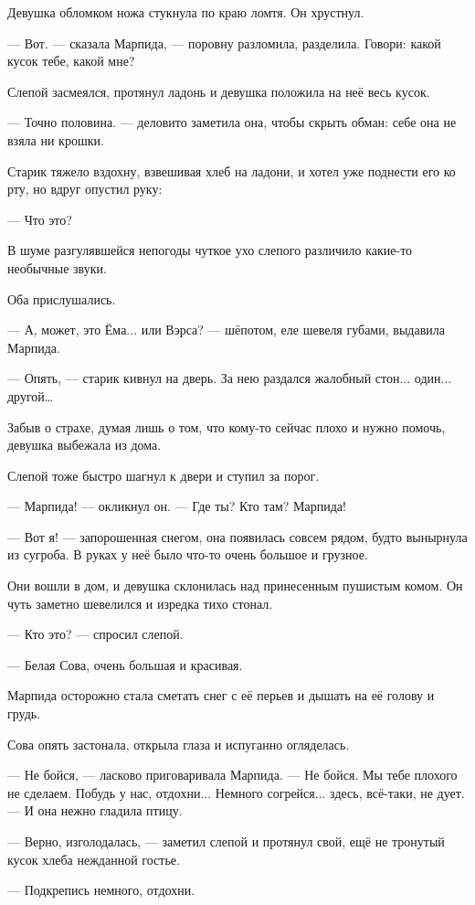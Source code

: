 \documentclass[oneside,final,14pt]{extreport}
\begin{document}
	Девушка обломком ножа стукнула по краю ломтя. Он хрустнул.
	
	— Вот. — сказала Марпида, — поровну разломила, разделила. Говори: какой кусок тебе, какой мне?
	
	Слепой засмеялся, протянул ладонь и девушка положила на неё весь кусок.
	
	— Точно половина. — деловито заметила она, чтобы скрыть обман: себе она не взяла ни крошки.
	
	Старик тяжело вздохну, взвешивая хлеб на ладони, и хотел уже поднести его ко рту, но вдруг опустил руку:
	
	— Что это?
	
	В шуме разгулявшейся непогоды чуткое ухо слепого различило какие-то необычные звуки.
	
	Оба прислушались.
	
	— А, может, это Ёма... или Вэрса? — шёпотом, еле шевеля губами, выдавила Марпида.
	
	— Опять, — старик кивнул на дверь. За нею раздался жалобный стон... один... другой…
	
	Забыв о страхе, думая лишь о том, что кому-то сейчас плохо и нужно помочь, девушка выбежала из дома.
	
	Слепой тоже быстро шагнул к двери и ступил за порог.
	
	— Марпида! — окликнул он. — Где ты? Кто там? Марпида!
	
	— Вот я! — запорошенная снегом, она появилась совсем рядом, будто вынырнула из сугроба. В руках у неё было что-то очень большое и грузное.
	
	Они вошли в дом, и девушка склонилась над принесенным пушистым комом. Он чуть заметно шевелился и изредка тихо стонал.
	
	— Кто это? — спросил слепой.
	
	— Белая Сова, очень большая и красивая.
	
	Марпида осторожно стала сметать снег с её перьев и дышать на её голову и грудь.
	
	Сова опять застонала, открыла глаза и испуганно огляделась.
	
	— Не бойся, — ласково приговаривала Марпида. — Не бойся. Мы тебе плохого не сделаем. Побудь у нас, отдохни... Немного согрейся... здесь, всё-таки, не дует. — И она нежно гладила птицу.
	
	— Верно, изголодалась, — заметил слепой и протянул свой, ещё не тронутый кусок хлеба нежданной гостье.
	
	— Подкрепись немного, отдохни.
	
\end{document}
